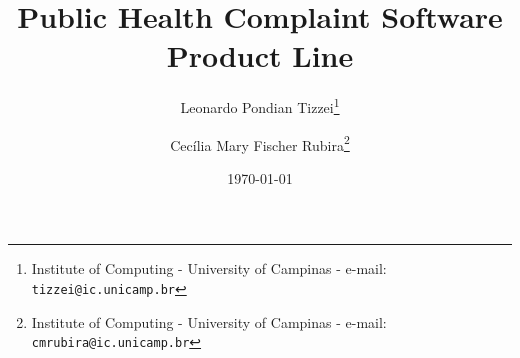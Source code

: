 \documentclass[11pt,twoside]{article}
\begin{document}
% 

%





%
\pagestyle{myheadings}

%
\title{Public Health Complaint Software Product Line}

\author{
Leonardo Pondian Tizzei\thanks{Institute of Computing - University of Campinas - e-mail: \texttt{tizzei@ic.unicamp.br}} \and
Cec\'{i}lia Mary Fischer Rubira\thanks{Institute of Computing - University of Campinas - e-mail: \texttt{cmrubira@ic.unicamp.br}}
}

\date{\today}

\maketitle
\newpage
\tableofcontents
\end{document}
